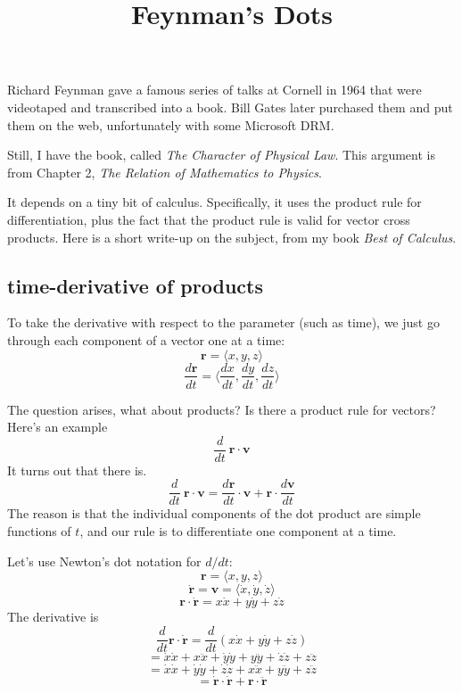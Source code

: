 \documentclass[11pt, oneside]{article}
\title{Feynman's Dots}
\date{}
\begin{document}
\maketitle
\Large

Richard Feynman gave a famous series of talks at Cornell in 1964 that were videotaped and transcribed into a book.  Bill Gates later purchased them and put them on the web, unfortunately with some Microsoft DRM.  

Still, I have the book, called \emph{The Character of Physical Law}.  This argument is from Chapter 2, \emph{The Relation of Mathematics to Physics}.

It depends on a tiny bit of calculus.  Specifically, it uses the product rule for differentiation, plus the fact that the product rule is valid for vector cross products.  Here is a short write-up on the subject, from my book \emph{Best of Calculus}.

\subsection*{time-derivative of products}
To take the derivative with respect to the parameter (such as time), we just go through each component of a vector one at a time:
\[ \mathbf{r} = \langle x, y, z \rangle \]
\[ \frac{d \mathbf{r}}{dt} =  \langle \frac{dx}{dt}, \frac{dy}{dt}, \frac{dz}{dt} \rangle \]

The question arises, what about products?  Is there a product rule for vectors?  Here's an example
\[ \frac{d}{dt} \ \mathbf{r} \cdot \mathbf{v} \]
It turns out that there is.
\[ \frac{d}{dt} \ \mathbf{r} \cdot \mathbf{v} = \frac{d \mathbf{r}}{dt} \cdot \mathbf{v} + \mathbf{r} \cdot \frac{d \mathbf{v}}{dt}  \]
The reason is that the individual components of the dot product are simple functions of $t$, and our rule is to differentiate one component at a time.

Let's use Newton's dot notation for $d/dt$:
\[ \mathbf{r} = \langle x, y, z\rangle \]
\[ \mathbf{\dot{r}} = \mathbf{v} = \langle \dot{x}, \dot{y}, \dot{z} \rangle \]
\[ \mathbf{r} \cdot \mathbf{\dot{r}}  = x \dot{x} + y \dot{y} + z \dot{z} \]
The derivative is
\[ \frac{d}{dt} \mathbf{r} \cdot \mathbf{\dot{r}}  = \frac{d}{dt} ( x \dot{x} + y \dot{y} + z \dot{z} ) \]
\[ = \dot{x} \dot{x} + x \ddot{x} + \dot{y} \dot{y} + y \ddot{y} + \dot{z} \dot{z} + z \ddot{z}  \]
\[ = \dot{x} \dot{x} + \dot{y} \dot{y} + \dot{z} \dot{z} + x \ddot{x}  + y \ddot{y} + z \ddot{z}  \]
\[ =  \mathbf{\dot{r}} \cdot \mathbf{\dot{r}} +  \mathbf{r} \cdot \mathbf{\ddot{r}} \]
\end{document}
